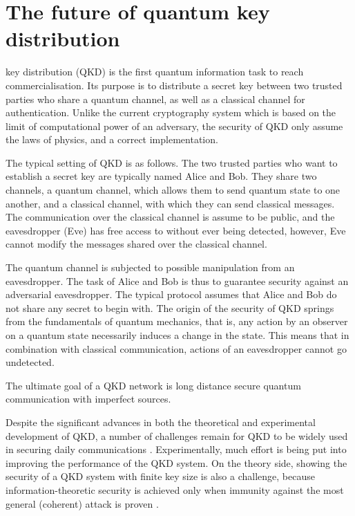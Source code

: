 \section{The future of quantum key distribution}
 
 key distribution (QKD) is the first quantum information task to reach commercialisation. Its purpose is to distribute a secret key between two trusted parties who share a quantum channel, as well as a classical channel for authentication. Unlike the current cryptography system which is based on the limit of computational power of an adversary, the security of QKD only assume the laws of physics, and a correct implementation.

The typical setting of QKD is as follows. The two trusted parties who want to establish a secret key are typically named Alice and Bob. They share two channels, a quantum channel, which allows them to send quantum state to one another, and a classical channel, with which they can send classical messages. The communication over the classical channel is assume to be public, and the eavesdropper (Eve) has free access to without  ever being detected, however, Eve cannot modify the messages shared over the classical channel.

The quantum channel is subjected to possible manipulation from an eavesdropper. The task of Alice and Bob is thus to guarantee security against an adversarial eavesdropper. The typical protocol assumes that Alice and Bob do not share any secret to begin with. The origin of the security of QKD springs from the fundamentals of quantum mechanics, that is, any action by an observer on a quantum state necessarily induces a change in the state. This means that in combination with classical communication, actions of an eavesdropper cannot go undetected.

The ultimate goal of a QKD network is long distance secure quantum communication with imperfect sources.

Despite the significant advances in both the theoretical and experimental development of QKD, a number of challenges remain for QKD to be widely used  in securing daily communications \cite{bib:RevModPhys.81.1301, bib:diamanti2016practical}. Experimentally, much effort is being put into improving the performance of the QKD system. On the theory side,  showing the security of a QKD system with finite key size is also a challenge,   because information-theoretic security is achieved only when immunity against the most general (coherent) attack is proven \cite{bib:diamanti2016practical}.

